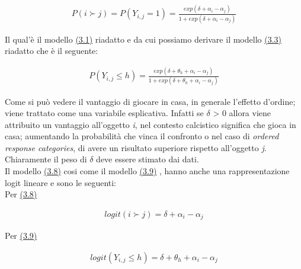 \begin{align} 
	P(i\succ j) = P(Y_{i,j} = 1) = \frac{exp(\delta + \alpha_{i} - \alpha_{j})}{1 + exp(\delta + \alpha_{i} - \alpha_{j})} \label{for:3.8} 
\end{align}

Il qual'è il modello \hyperref[for:3.1]{(3.1)} riadatto e da cui possiamo derivare il modello \hyperref[for:3.2.1]{(3.3)} riadatto che è il seguente:

\begin{align}
	P(Y_{i,j}\leq h) =  \frac{exp(\delta + \theta_{h} + \alpha_{i} - \alpha_{j})}{1 + exp(\delta + \theta_{h} + \alpha_{i} - \alpha_{j})} \label{for:3.9}
\end{align}

Come si può vedere il vantaggio di giocare in casa, in generale l'effetto d'ordine; viene trattato come una variabile esplicativa. Infatti se $\delta$ > 0 allora viene attribuito un vantaggio all'oggetto \textit{i}, nel contesto calcistico significa che gioca in casa; aumentando la probabilità che vinca il confronto o nel caso di \emph{ordered response categories}, di avere un risultato superiore rispetto all'oggetto \textit{j}. Chiaramente il peso di $\delta$ deve essere stimato dai dati.\\

Il modello \hyperref[for:3.8]{(3.8)} cosi come il modello \hyperref[for:3.9]{(3.9)} , hanno anche una rappresentazione logit lineare e sono le seguenti:\\

Per \hyperref[for:3.8]{(3.8)}

\begin{align}
	logit(i \succ j) =  \delta + \alpha_i - \alpha_j 
\end{align}

Per \hyperref[for:3.9]{(3.9)}

\begin{align}
	logit(Y_{i,j}\leq h) =  \delta + \theta_{h} + \alpha_i - \alpha_j 
\end{align}
	
